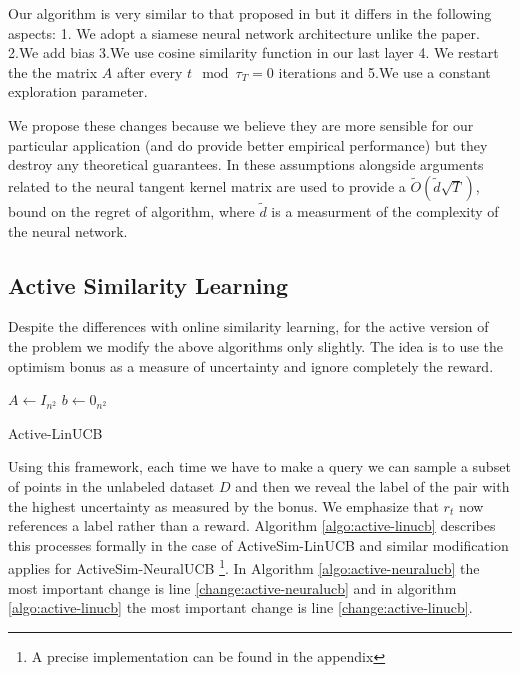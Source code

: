 \documentclass{article}
\begin{document}
Our algorithm is very similar to that proposed in \cite{neuralucb} but it differs in the following aspects: 1. We adopt a siamese neural network architecture unlike the paper.
2.We add bias 3.We use cosine similarity function in our last layer 4. We restart the the matrix $A$ after every $t \mod \tau_T = 0$ iterations and 5.We use a constant exploration parameter.

We propose these changes because we believe they are more sensible for our particular application (and do provide better empirical performance) but they destroy any theoretical guarantees.
In \cite{neuralucb} these assumptions alongside arguments related to the  neural tangent kernel matrix \cite{neuraltangentkernel} are used to provide a $\tilde{O}(\tilde{d}\sqrt{T})$, bound on the regret of algorithm, where
$\tilde{d}$ is a measurment of the complexity of the neural network.


  \subsection{Active Similarity Learning}
  Despite the differences with online similarity learning, for the active version of the problem we modify the above algorithms only slightly.
  The idea is to use the optimism bonus as a measure of uncertainty and ignore completely the reward.
\begin{algorithm}
    $A \gets I_{n^2}$\;
    $b \gets 0_{n^2}$\;
    \caption{Active-LinUCB}\label{algo:active-linucb}
\end{algorithm}

Using this framework, each time we have to make a query we can sample a subset of points in the unlabeled dataset $D$  and then we reveal the label of the pair with the highest uncertainty as measured by the bonus.
We emphasize that $r_t$ now references a label rather than a reward.
Algorithm \ref{algo:active-linucb} describes this processes formally in the case of ActiveSim-LinUCB and similar modification applies for ActiveSim-NeuralUCB \footnote{A precise implementation can be found in the appendix}.
In Algorithm \ref{algo:active-neuralucb} the most important change is line \ref{change:active-neuralucb} and in algorithm
\ref{algo:active-linucb} the most important change is line \ref{change:active-linucb}.
\end{document}
